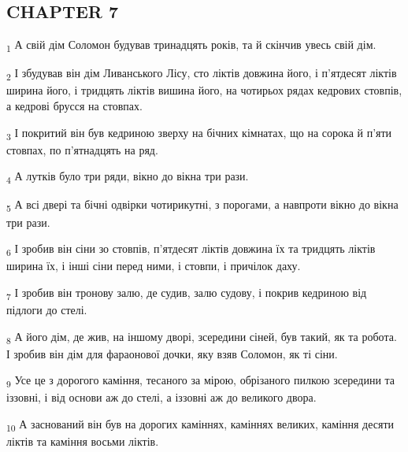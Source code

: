 \subsection{CHAPTER 7}
\begin{tcolorbox}
\textsubscript{1} А свій дім Соломон будував тринадцять років, та й скінчив увесь свій дім.
\end{tcolorbox}
\begin{tcolorbox}
\textsubscript{2} І збудував він дім Ливанського Лісу, сто ліктів довжина його, і п'ятдесят ліктів ширина його, і тридцять ліктів вишина його, на чотирьох рядах кедрових стовпів, а кедрові брусся на стовпах.
\end{tcolorbox}
\begin{tcolorbox}
\textsubscript{3} І покритий він був кедриною зверху на бічних кімнатах, що на сорока й п'яти стовпах, по п'ятнадцять на ряд.
\end{tcolorbox}
\begin{tcolorbox}
\textsubscript{4} А лутків було три ряди, вікно до вікна три рази.
\end{tcolorbox}
\begin{tcolorbox}
\textsubscript{5} А всі двері та бічні одвірки чотирикутні, з порогами, а навпроти вікно до вікна три рази.
\end{tcolorbox}
\begin{tcolorbox}
\textsubscript{6} І зробив він сіни зо стовпів, п'ятдесят ліктів довжина їх та тридцять ліктів ширина їх, і інші сіни перед ними, і стовпи, і причілок даху.
\end{tcolorbox}
\begin{tcolorbox}
\textsubscript{7} І зробив він тронову залю, де судив, залю судову, і покрив кедриною від підлоги до стелі.
\end{tcolorbox}
\begin{tcolorbox}
\textsubscript{8} А його дім, де жив, на іншому дворі, зсередини сіней, був такий, як та робота. І зробив він дім для фараонової дочки, яку взяв Соломон, як ті сіни.
\end{tcolorbox}
\begin{tcolorbox}
\textsubscript{9} Усе це з дорогого каміння, тесаного за мірою, обрізаного пилкою зсередини та іззовні, і від основи аж до стелі, а іззовні аж до великого двора.
\end{tcolorbox}
\begin{tcolorbox}
\textsubscript{10} А заснований він був на дорогих каміннях, каміннях великих, каміння десяти ліктів та каміння восьми ліктів.
\end{tcolorbox}
